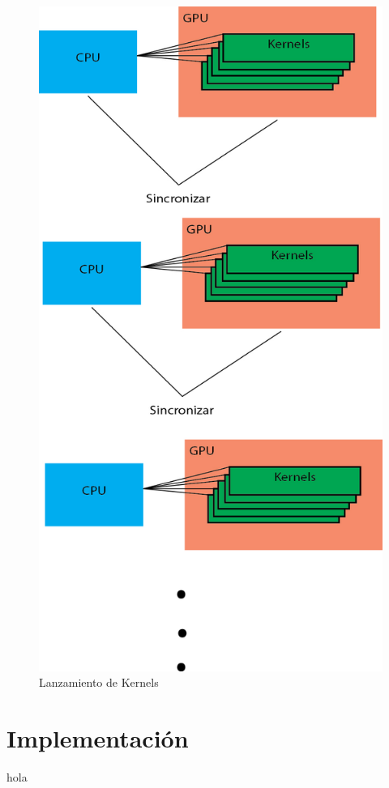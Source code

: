 \begin{figure}[h]
			\centering
				\includegraphics[scale=1]{img/lanzamiento.jpg}
			\caption{Lanzamiento de Kernels }
\end{figure}

\pagebreak
\section{Implementación}
hola



